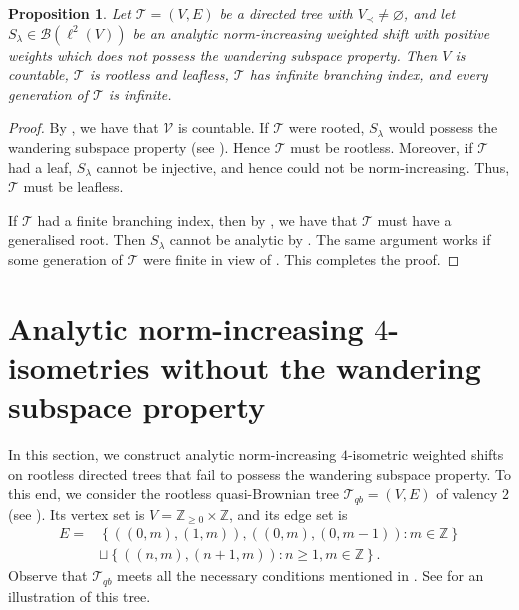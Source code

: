 \documentclass[11pt, reqno, a4paper]{amsart}
\newtheorem{proposition}[theorem]{Proposition}
\theoremstyle{definition}
\newcommand{\calB}{{\mathcal{B}}}
\newcommand{\calV}{{\mathcal{V}}}
\newcommand{\scrT}{{\mathscr T}}
\renewcommand{\ge}{\geqslant}
\newcommand{\Z}{\mathbb Z}
\numberwithin{equation}{section}
\begin{document}
    \begin{proposition}
        \label{prop:necessity-of-tree structure}
        Let $\scrT=(V,E)$ be a directed tree with $V_{\prec}\ne\varnothing$, and let $S_{\lambda}\in\calB(\ell^2(V))$ be an analytic norm-increasing weighted shift with positive weights which does not possess the wandering subspace property. Then $V$ is countable, $\scrT$ is rootless and leafless, $\scrT$ has infinite branching index, and every generation of $\scrT$ is infinite.
    \end{proposition}

    \begin{proof}
        By \cite[Proposition 3.1.10]{MR2919910}, we have that $\calV$ is countable. If $\scrT$ were rooted, $S_{\lambda}$ would possess the wandering subspace property (see \cite[Proposition 1.3.4]{MR3740250}). Hence $\scrT$ must be rootless. Moreover, if $\scrT$ had a leaf, $S_{\lambda}$ cannot be injective, and hence could not be norm-increasing. Thus, $\scrT$ must be leafless.

        If $\scrT$ had a finite branching index, then by , we have that $\scrT$ must have a generalised root. Then $S_{\lambda}$ cannot be analytic by . The same argument works if some generation of $\scrT$ were finite in view of . This completes the proof. 
    \end{proof}



    \section{Analytic norm-increasing \texorpdfstring{$4$}{4}-isometries without the wandering subspace property}\label{sec:4-isometry}
    
    In this section, we construct analytic norm-increasing $4$-isometric weighted shifts on rootless directed trees that fail to possess the wandering subspace property. To this end, we consider the rootless quasi-Brownian tree $\scrT_{qb} = ( V,  E)$ of valency $2$ (see \cite[\S 5]{MR5052237}). Its vertex set is $ V = \Z_{\ge 0} \times \Z$, and its edge set is
    \begin{align*}
         E = &\left\{ \left( (0,m), (1, m) \right),  \left( (0,m), (0, m-1) \right) : m \in \Z \right\} \\ & \sqcup \left\{  \left( (n, m) , (n+1, m) \right) : n \ge 1, m \in \Z \right\}.
    \end{align*}
    Observe that $\scrT_{qb}$ meets all the necessary conditions mentioned in . 
    See  for an illustration of this tree.
    
\end{document}
